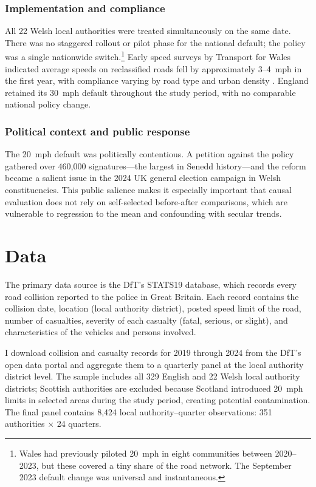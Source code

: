 \documentclass[12pt]{article}
\begin{document}
\subsubsection*{Implementation and compliance} All 22 Welsh local authorities were treated simultaneously on the same date. There was no staggered rollout or pilot phase for the national default; the policy was a single nationwide switch.\footnote{Wales had previously piloted 20~mph in eight communities between 2020--2023, but these covered a tiny share of the road network. The September 2023 default change was universal and instantaneous.} Early speed surveys by Transport for Wales indicated average speeds on reclassified roads fell by approximately 3--4~mph in the first year, with compliance varying by road type and urban density \citep{tfw2024}. England retained its 30~mph default throughout the study period, with no comparable national policy change.

\subsubsection*{Political context and public response} The 20~mph default was politically contentious. A petition against the policy gathered over 460,000 signatures---the largest in Senedd history---and the reform became a salient issue in the 2024 UK general election campaign in Welsh constituencies. This public salience makes it especially important that causal evaluation does not rely on self-selected before-after comparisons, which are vulnerable to regression to the mean and confounding with secular trends.

\section{Data}
\label{sec:data}

The primary data source is the DfT's STATS19 database, which records every road collision reported to the police in Great Britain. Each record contains the collision date, location (local authority district), posted speed limit of the road, number of casualties, severity of each casualty (fatal, serious, or slight), and characteristics of the vehicles and persons involved.

I download collision and casualty records for 2019 through 2024 from the DfT's open data portal and aggregate them to a quarterly panel at the local authority district level. The sample includes all 329 English and 22 Welsh local authority districts; Scottish authorities are excluded because Scotland introduced 20~mph limits in selected areas during the study period, creating potential contamination. The final panel contains 8,424 local authority--quarter observations: 351 authorities $\times$ 24 quarters.
\end{document}
